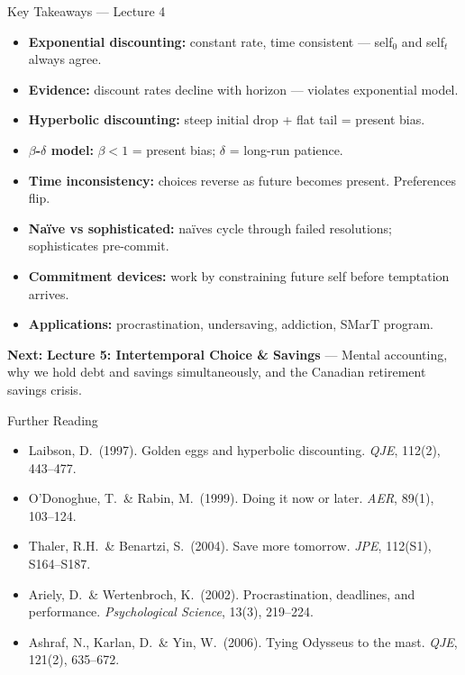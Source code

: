 \documentclass[aspectratio=169]{beamer}
\begin{document}
\begin{frame}{Key Takeaways --- Lecture 4}
\begin{itemize}
  \item[\textcolor{beteal}{\checkmark}] \textbf{Exponential discounting:} constant rate, time consistent --- self$_0$ and self$_t$ always agree.
  \item[\textcolor{beteal}{\checkmark}] \textbf{Evidence:} discount rates decline with horizon --- violates exponential model.
  \item[\textcolor{beteal}{\checkmark}] \textbf{Hyperbolic discounting:} steep initial drop + flat tail = present bias.
  \item[\textcolor{beteal}{\checkmark}] \textbf{$\beta$-$\delta$ model:} $\beta < 1$ = present bias; $\delta$ = long-run patience.
  \item[\textcolor{beteal}{\checkmark}] \textbf{Time inconsistency:} choices reverse as future becomes present. Preferences flip.
  \item[\textcolor{beteal}{\checkmark}] \textbf{Na\"{i}ve vs sophisticated:} na\"{i}ves cycle through failed resolutions; sophisticates pre-commit.
  \item[\textcolor{beteal}{\checkmark}] \textbf{Commitment devices:} work by constraining future self before temptation arrives.
  \item[\textcolor{beteal}{\checkmark}] \textbf{Applications:} procrastination, undersaving, addiction, SMarT program.
\end{itemize}
\medskip\textcolor{beblue}{\textbf{Next:}} \textbf{Lecture 5: Intertemporal Choice \& Savings} --- Mental accounting, why we hold debt and savings simultaneously, and the Canadian retirement savings crisis.
\end{frame}

\begin{frame}{Further Reading}
\begin{itemize}
  \item Laibson, D.\ (1997). Golden eggs and hyperbolic discounting. \textit{QJE}, 112(2), 443--477.
  \item O'Donoghue, T.\ \& Rabin, M.\ (1999). Doing it now or later. \textit{AER}, 89(1), 103--124.
  \item Thaler, R.H.\ \& Benartzi, S.\ (2004). Save more tomorrow. \textit{JPE}, 112(S1), S164--S187.
  \item Ariely, D.\ \& Wertenbroch, K.\ (2002). Procrastination, deadlines, and performance. \textit{Psychological Science}, 13(3), 219--224.
  \item Ashraf, N., Karlan, D.\ \& Yin, W.\ (2006). Tying Odysseus to the mast. \textit{QJE}, 121(2), 635--672.
\end{itemize}
\end{frame}
\end{document}
